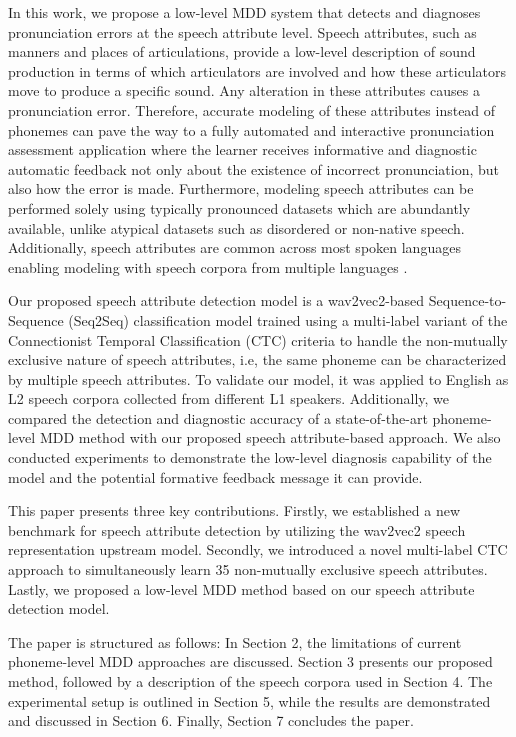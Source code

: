 \documentclass[12pt]{elsarticle}
\begin{document}
In this work, we propose a low-level MDD system that detects and diagnoses pronunciation errors at the speech attribute level. Speech attributes, such as manners and places of articulations, provide a low-level description of sound production in terms of which articulators are involved and how these articulators move to produce a specific sound. Any alteration in these attributes causes a pronunciation error. Therefore, accurate modeling of these attributes instead of phonemes can pave the way to a fully automated and interactive pronunciation assessment application where the learner receives informative and diagnostic automatic feedback not only about the existence of incorrect pronunciation, but also how the error is made. Furthermore, modeling speech attributes can be performed solely using typically pronounced datasets which are abundantly available, unlike atypical datasets such as disordered or non-native speech. Additionally, speech attributes are common across most spoken languages enabling modeling with speech corpora from multiple languages \cite{RN146}. 

Our proposed speech attribute detection model is a wav2vec2-based Sequence-to-Sequence (Seq2Seq) classification model trained using a multi-label variant of the Connectionist Temporal Classification (CTC) criteria to handle the non-mutually exclusive nature of speech attributes, i.e, the same phoneme can be characterized by multiple speech attributes. To validate our model, it was applied to English as L2 speech corpora collected from different L1 speakers. Additionally, we compared the detection and diagnostic accuracy of a state-of-the-art phoneme-level MDD method with our proposed speech attribute-based approach. We also conducted experiments to demonstrate the low-level diagnosis capability of the model and the potential formative feedback message it can provide.

This paper presents three key contributions. Firstly, we established a new benchmark for speech attribute detection by utilizing the wav2vec2 speech representation upstream model. Secondly, we introduced a novel multi-label CTC approach to simultaneously learn 35 non-mutually exclusive speech attributes. Lastly, we proposed a low-level MDD method based on our speech attribute detection model.


The paper is structured as follows: In Section 2, the limitations of current phoneme-level MDD approaches are discussed. Section 3 presents our proposed method, followed by a description of the speech corpora used in Section 4. The experimental setup is outlined in Section 5, while the results are demonstrated and discussed in Section 6. Finally, Section 7 concludes the paper.
\end{document}
